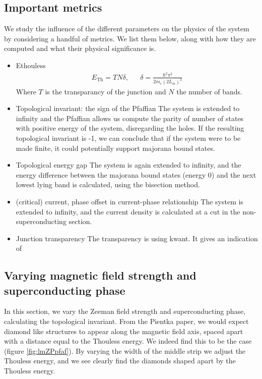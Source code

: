 \documentclass[10pt,a4paper]{article}
\begin{document}
	\subsection{Important metrics}
	We study the influence of the different parameters on the physics of the system by considering a handful of metrics.
	We list them below, along with how they are computed and what their physical significance is.
		\begin{itemize}
			\item \Gls{Ethouless}
				\begin{align}\label{eq:thouless}
				E_\text{Th} = TN\delta
				, && \delta = \frac{\hbar^2 \pi^2}
				{2 m_e \left( 2 L_m \right)^2}
				\end{align}
			Where $T$ is the transparancy of the junction and $N$ the number of bands.
			\item Topological invariant: the sign of the Pfaffian
				\subitem The system is extended to infinity and the Pfaffian allows us compute the parity of number of states with positive energy of the system, disregarding the holes. If the resulting topological invariant is -1, we can conclude that if the system were to be made finite, it could potentially support majorana bound states.

			\item Topological energy gap
				\subitem The system is again extended to infinity, and the energy difference between the majorana bound states (energy 0) and the next lowest lying band is calculated, using the bisection method.
				
			\item (critical) current, phase offset in current-phase relationship
				\subitem The system is extended to infinity, and the current density is calculated at a cut in the non-superconducting section.
			
			\item Junction transparency
				\subitem The transparency is using kwant. It gives an indication of 
		\end{itemize}
\newpage
	\subsection{Varying magnetic field strength and superconducting phase}
		In this section, we vary the Zeeman field strength and superconducting phase, calculating the topological invariant.
		From the Pientka paper, we would expect diamond like structures to appear along the magnetic field axis, spaced apart with a distance equal to the Thouless energy.
		We indeed find this to be the case (figure \ref{fig:lmZPpfaf}).
		By varying the width of the middle strip we adjust the Thouless energy, and we see clearly find the diamonds shaped apart by the Thouless energy.
		
\end{document}
